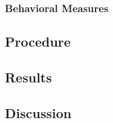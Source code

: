 \documentclass[../dissertation.tex]{subfiles}
\begin{document}
\subsubsection{Behavioral Measures} 
 
\subsection{Procedure}

\subsection{Results}

\subsection{Discussion}
\end{document}
